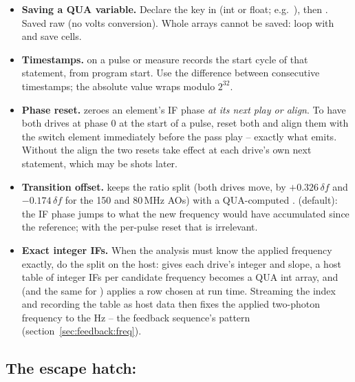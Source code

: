 \begin{itemize}[nosep]
  \item \textbf{Saving a QUA variable.} Declare the key in 
    (int or float; e.g.\ ), then
    . Saved raw (no volts conversion). Whole
    arrays cannot be saved: loop with  and save cells.
  \item \textbf{Timestamps.}  on a pulse or measure
    records the start cycle of that statement, from program start. Use the
    difference between consecutive timestamps; the absolute value wraps
    modulo $2^{32}$.
  \item \textbf{Phase reset.}  zeroes an element's IF
    phase \emph{at its next play or align}. To have both drives at phase 0
    at the start of a pulse, reset both and align them with the switch
    element immediately before the pass play -- exactly what
     emits. Without the align the two resets take
    effect at each drive's own next statement, which may be shots later.
  \item \textbf{Transition offset.}  keeps the  ratio split (both drives move, by
    $+0.326\,\delta f$ and $-0.174\,\delta f$ for the 150 and 80\,MHz AOs)
    with a QUA-computed .  (default): the IF
    phase jumps to what the new frequency would have accumulated since the
    reference; with the per-pulse reset that is irrelevant.
  \item \textbf{Exact integer IFs.} When the analysis must know the applied
    frequency exactly, do the split on the host:  gives each drive's integer
     and slope, a host table of integer IFs per candidate
    frequency becomes a QUA int array, and  (and the same for ) applies
    a row chosen at run time. Streaming the index  and recording the
    table as host data then fixes the applied two-photon frequency to the Hz
    -- the feedback sequence's pattern (section~\ref{sec:feedback:freq}).
\end{itemize}

\subsection{The escape hatch: }

